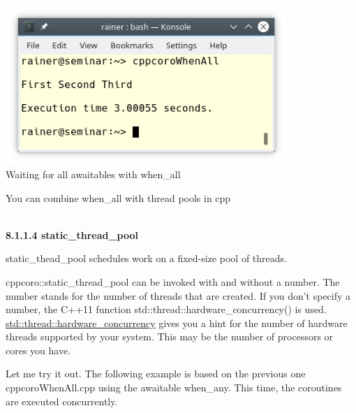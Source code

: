 \begin{center}
\includegraphics[width=0.8\textwidth]{content/5/chapter8/images/5.png}\\
Waiting for all awaitables with when\_all
\end{center}

You can combine when\_all with thread pools in cpp

\hspace*{\fill} \\ %
\noindent
\textbf{8.1.1.4\hspace{0.2cm} static\_thread\_pool}

static\_thead\_pool schedules work on a fixed-size pool of threads.

cppcoro::static\_thread\_pool can be invoked with and without a number. The number stands for the number of threads that are created. If you don’t specify a number, the C++11 function std::thread::hardware\_concurrency() is used. \href{https://en.cppreference.com/w/cpp/thread/thread/hardware_concurrency}{std::thread::hardware\_concurrency} gives you a hint for the number of hardware threads supported by your system. This may be the number of processors or cores you have.

Let me try it out. The following example is based on the previous one cppcoroWhenAll.cpp using the awaitable when\_any. This time, the coroutines are executed concurrently.


